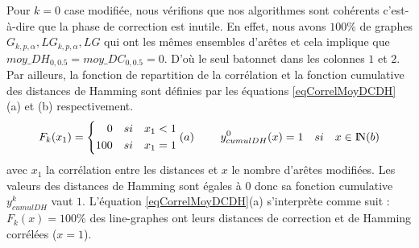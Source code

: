 Pour $k=0$ case modifi\'ee, nous v\'erifions que nos algorithmes sont coh\'erents c'est-\`a-dire que la phase de correction est inutile. En effet, nous avons $100\%$ de graphes $G_{k,p,\alpha}, LG_{k,p,\alpha}, LG$ qui ont les m\^emes ensembles d'ar\^etes et cela implique que $moy\_DH_{0,0.5} = moy\_DC_{0,0.5} = 0$. D'o\`u le seul batonnet dans les colonnes $1$ et $2$. Par ailleurs, la fonction de repartition de la corr\'elation et la fonction cumulative des distances de Hamming sont d\'efinies par les \'equations \ref{eqCorrelMoyDCDH} (a) et (b)  respectivement.
\begin{equation}
\label{eqCorrelMoyDCDH}
F_k(x_1) = \left\{
	\begin{aligned}
	0 \hspace{1 em} si \hspace{1 em} x_1 < 1 \\
	100  \hspace{1 em}  si  \hspace{1 em}  x_1 = 1
	\end{aligned}
	\right.(a)
	\\~~~~~~~
	y_{cumulDH}^{0}(x) = 1  \hspace{1 em}  si  \hspace{1 em}   x \in \mbox{I\hspace{-.15em}N} (b)
\end{equation}
avec $x_1$ la corr\'elation entre les distances et $x$ le nombre d'ar\^etes modifi\'ees.
Les valeurs des distances de Hamming sont \'egales \`a $0$ donc sa fonction cumulative $y_{cumulDH}^{k}$ vaut $1$. 
L'\'equation  \ref{eqCorrelMoyDCDH}(a) s'interpr\`ete comme suit : $F_k(x) = 100\%$ des line-graphes ont leurs distances de correction et de Hamming corr\'el\'ees ($x = 1$).
\newline

